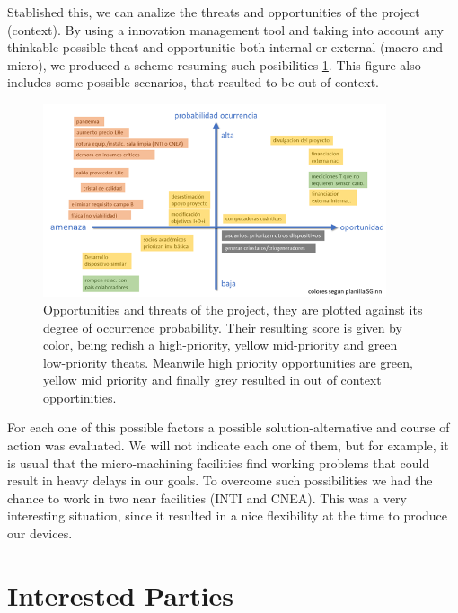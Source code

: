 Stablished this, we can analize the threats and opportunities of the project (context). By using a innovation management tool and taking into account any thinkable possible theat and opportunitie both internal or external (macro and micro), we produced a scheme resuming such posibilities \ref{fig:innov-theats_opportinities}. This figure also includes some possible scenarios, that resulted to be out-of context. 

\begin{figure}
    \includegraphics[width=0.9\textwidth]{figures/innovation/theatsOpportunitiesInnov.png}
    \caption{Opportunities and threats of the project, they are plotted against its degree of occurrence probability. Their resulting score is given by color, being redish a high-priority, yellow mid-priority and green low-priority theats. Meanwile high priority opportunities are green, yellow mid priority and finally grey resulted in out of context opportinities.}
    \label{fig:innov-theats_opportinities}
\end{figure}

For each one of this possible factors a possible solution-alternative and course of action was evaluated. We will not indicate each one of them, but for example, it is usual that the micro-machining facilities find working problems that could result in heavy delays in our goals. To overcome such possibilities we had the chance to work in two near facilities (INTI and CNEA). This was a very interesting situation, since it resulted in a nice flexibility at the time to produce our devices.

\section{Interested Parties}
\label{sec:interested_parties}

